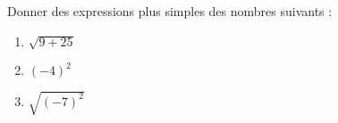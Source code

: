 
\begin{exercice}\label{exosmath-0251}

    Donner des expressions plus simples des nombres suivants :
    \begin{multicols}{3}
        \begin{enumerate}
            \item
                \( \sqrt{9+25}\)
            \item
                \( (-4)^2\)
            \item
                \( \sqrt{(-7)^2}\)
        \end{enumerate}
    \end{multicols}

\end{exercice}

